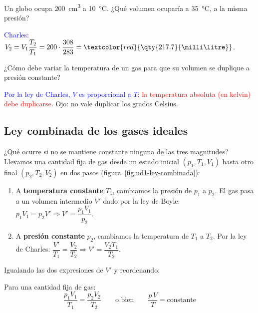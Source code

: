 \begin{exercise}
    Un globo ocupa \qty{200}{\cubic\centi\metre} a \qty{10}{\degreeCelsius}. ¿Qué volumen ocuparía a \qty{35}{\degreeCelsius}, a la
    misma presión?
    \begin{solu}
        \textcolor{blue}{Charles:} \(V_2 = V_1 \dfrac{T_2}{T_1} = 200 \cdot \dfrac{308}{283} = \textcolor{red}{\qty{217.7}{\milli\litre}}\).
    \end{solu}
\end{exercise}

\begin{exercise}
    ¿Cómo debe variar la temperatura de un gas para que su volumen se duplique a presión constante?
    \begin{solu}
        \textcolor{blue}{Por la ley de Charles, \(V\) es proporcional a \(T\):} \textcolor{red}{la temperatura absoluta (en kelvin) debe
        duplicarse}. Ojo: no vale duplicar los grados Celsius.
    \end{solu}
\end{exercise}

\subsection{Ley combinada de los gases ideales}

¿Qué ocurre si no se mantiene constante ninguna de las tres magnitudes? Llevamos una cantidad fija de gas desde un estado
inicial \((p_1, T_1, V_1)\) hasta otro final \((p_2, T_2, V_2)\) en dos pasos (figura~\ref{fig:ud1-ley-combinada}):

\begin{enumerate}[label=\numberballblue]
    \item A \textbf{temperatura constante} \(T_1\), cambiamos la presión de \(p_1\) a \(p_2\). El gas pasa a un volumen intermedio
    \(V'\) dado por la ley de Boyle: \(p_1 V_1 = p_2 V' \Rightarrow V' = \dfrac{p_1 V_1}{p_2}\).
    \item A \textbf{presión constante} \(p_2\), cambiamos la temperatura de \(T_1\) a \(T_2\). Por la ley de Charles:
    \(\dfrac{V'}{T_1} = \dfrac{V_2}{T_2} \Rightarrow V' = \dfrac{V_2 T_1}{T_2}\).
\end{enumerate}

Igualando las dos expresiones de \(V'\) y reordenando:

\begin{definition}
    Para una cantidad fija de gas:
    \[ \frac{p_1 V_1}{T_1} = \frac{p_2 V_2}{T_2} \qquad\text{o bien}\qquad \frac{p\,V}{T} = \text{constante} \]
\end{definition}

